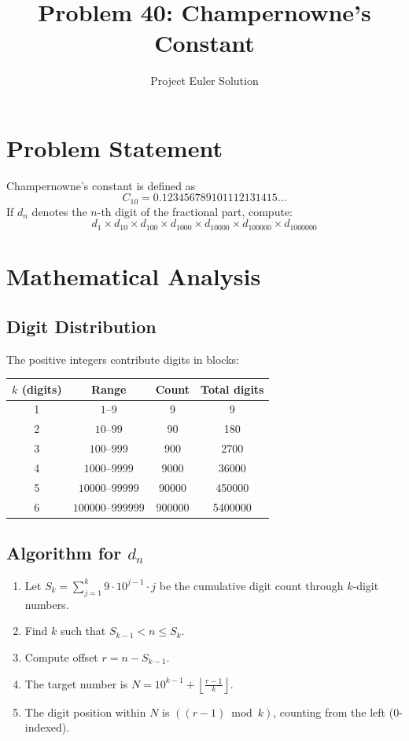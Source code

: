 \documentclass[12pt]{article}
\title{Problem 40: Champernowne's Constant}
\author{Project Euler Solution}
\date{}
\begin{document}
\maketitle

\section{Problem Statement}
Champernowne's constant is defined as
\[
    C_{10} = 0.123456789101112131415\ldots
\]
If $d_n$ denotes the $n$-th digit of the fractional part, compute:
\[
    d_1 \times d_{10} \times d_{100} \times d_{1000} \times d_{10000} \times d_{100000} \times d_{1000000}
\]

\section{Mathematical Analysis}

\subsection{Digit Distribution}
The positive integers contribute digits in blocks:

\begin{center}
\begin{tabular}{cccc}
\hline
$k$ (digits) & Range & Count & Total digits \\
\hline
1 & $1$--$9$ & 9 & 9 \\
2 & $10$--$99$ & 90 & 180 \\
3 & $100$--$999$ & 900 & 2700 \\
4 & $1000$--$9999$ & 9000 & 36000 \\
5 & $10000$--$99999$ & 90000 & 450000 \\
6 & $100000$--$999999$ & 900000 & 5400000 \\
\hline
\end{tabular}
\end{center}

\subsection{Algorithm for $d_n$}
\begin{enumerate}
    \item Let $S_k = \sum_{j=1}^{k} 9 \cdot 10^{j-1} \cdot j$ be the cumulative digit count through $k$-digit numbers.
    \item Find $k$ such that $S_{k-1} < n \le S_k$.
    \item Compute offset $r = n - S_{k-1}$.
    \item The target number is $N = 10^{k-1} + \left\lfloor \frac{r-1}{k} \right\rfloor$.
    \item The digit position within $N$ is $\left( (r-1) \bmod k \right)$, counting from the left (0-indexed).
\end{enumerate}
\end{document}
